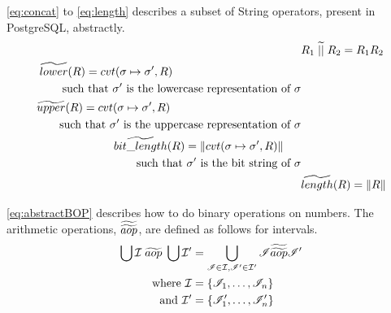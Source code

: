 \autoref{eq:concat} to \ref{eq:length} describes a subset of String operators, present in PostgreSQL, abstractly.
\begin{align}\label{eq:concat}
    &R_1 \;\aab{||}\; R_2 = R_1R_2 \\
    \begin{split}
        &\aab{lower}(R) = cvt(\sigma \mapsto \sigma', R) \\
        & \quad \quad \text{such } \text{that } \sigma' \text{ is the lowercase representation of } \sigma
    \end{split}\\
    \begin{split}
        & \aab{upper}(R) = cvt(\sigma \mapsto \sigma', R) \\
        & \quad \quad \text{such } \text{that $\sigma'$ is the uppercase representation of $\sigma$}
    \end{split}\\
    \begin{split}
        &\aab{bit\_length}(R) = \|cvt(\sigma \mapsto \sigma', R)\| \\
        & \quad \quad \text{such } \text{that $\sigma'$ is the bit string of $\sigma$}
    \end{split} \\ \label{eq:length}
    &\aab{length}(R) = \|R\|
\end{align}

\autoref{eq:abstractBOP} describes how to do binary operations on numbers.
The arithmetic operations, $\widetilde{\widetilde{aop}}$, are defined as follows for intervals.
\begin{align}\label{eq:abstractBOP}
    \bigcup \mathcal{I} \;\aab{aop}\; \bigcup \mathcal{I}' &= \bigcup_{\mathscr{I}\in \mathcal{I}, \mathscr{I}'\in \mathcal{I}'}\mathscr{I}\aaab{aop}\mathscr{I}'\nonumber\\
    \text{where } \mathcal{I}&=\{\mathscr{I}_1,\dots,\mathscr{I}_n\}\nonumber\\
    \text{and } \mathcal{I}'&=\{\mathscr{I}'_1,\dots,\mathscr{I}'_n\}
\end{align}

